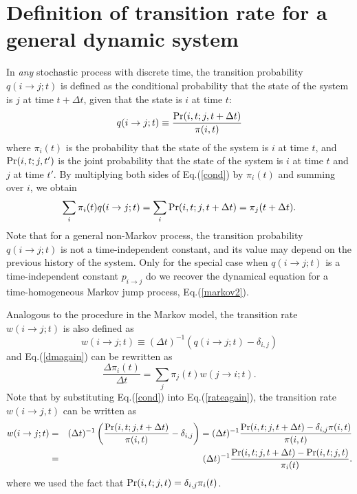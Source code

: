 \documentclass[aps,pre,amsmath,amssymb,floatfix,preprint,nofootinbib]{revtex4}
\begin{document}
\section{Definition of transition rate for a general dynamic system}\label{trcnd}
In {\it any} stochastic process with discrete time, the transition probability $q(i \to j; t)$  is defined as the conditional probability that the state of the system is $j$ at time $t+\Delta t$, given that the state is $i$ at time $t$:
\begin{equation}
q(i \to j;t) \equiv \frac{{\rm Pr}(i,t;j,t+\Delta t)}{\pi(i,t)} \label{cond}
\end{equation}
where $\pi_i(t)$ is the probability that the state of the system is $i$ at time $t$, and ${\rm Pr}(i,t; j,t')$ is the joint probability that the state of the system is $i$ at time $t$ and $j$ at time $t'$. By multiplying both sides of Eq.(\ref{cond}) by $\pi_i(t)$ and summing over $i$, we obtain
\begin{equation}
\sum_i \pi_i(t) q (i \to j;t) = \sum_i {\rm Pr}(i,t;j,t+\Delta t) = \pi_j(t+\Delta t). \label{dmagain}
\end{equation}  
Note that for a general non-Markov process, the transition probability $q(i \to j; t)$ is not a time-independent constant, and its value may depend on the previous history of the system. Only for the special case when $q(i \to j;t)$ is a time-independent constant $p_{i \to j}$ do we recover the dynamical equation for a time-homogeneous Markov jump process, Eq.(\ref{markov2}).

Analogous to the procedure in the Markov model, the transition rate $w(i \to j; t)$ is also defined as
\begin{equation}
w(i \to j; t) \equiv (\Delta t)^{-1}(q(i \to j;t) - \delta_{i,j}) \label{rateagain}
\end{equation}
and Eq.(\ref{dmagain}) can be rewritten as
\begin{equation}
\frac{\Delta \pi_i (t)}{\Delta t} = \sum_j \pi_j(t) w(j \to i; t). \label{dmagain2}
\end{equation}
Note that by substituting Eq.(\ref{cond}) into Eq.(\ref{rateagain}), the transition rate $w(i \to j, t)$ can be written as
\begin{eqnarray}
w(i \to j; t) &=& (\Delta t)^{-1} \left(\frac{{\rm Pr}(i,t;j,t+\Delta t)}{\pi(i,t)}-\delta_{i,j}\right)= (\Delta t)^{-1} \frac{{\rm Pr}(i,t;j,t+\Delta t)-\delta_{i,j} \pi(i,t)}{\pi(i,t)}\nonumber\\
&=&  (\Delta t)^{-1} \frac{{\rm Pr}(i,t;j,t+\Delta t)-{\rm Pr}(i,t;j,t)}{\pi_i(t)}. \label{alk}
\end{eqnarray}
where we used the fact that ${\rm Pr}(i,t;j,t)=\delta_{i,j} \pi_i(t)$. 
\end{document}
